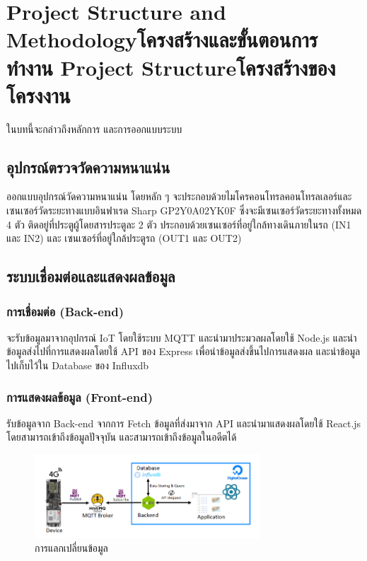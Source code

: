 \chapter{\ifproject%
\ifenglish Project Structure and Methodology\else โครงสร้างและขั้นตอนการทำงาน\fi
\else%
\ifenglish Project Structure\else โครงสร้างของโครงงาน\fi
\fi
}

ในบทนี้จะกล่าวถึงหลักการ และการออกแบบระบบ

\section{อุปกรณ์ตรวจวัดความหนาแน่น}
ออกแบบอุปกรณ์วัดความหนาแน่น โดยหลัก ๆ จะประกอบด้วยไมโครคอนโทรลคอนโทรลเลอร์และเซนเซอร์วัดระยะทางแบบอินฟาเรด Sharp GP2Y0A02YK0F ซึ่งจะมีเซนเซอร์วัดระยะทางทั้งหมด 4 ตัว ติดอยู่ที่ประตูผู้โดยสารประตูละ 2 ตัว ประกอบด้วยเซนเซอร์ที่อยู่ใกล้ทางเดินภายในรถ (IN1 และ IN2) และ เซนเซอร์ที่อยู่ใกล้ประตูรถ (OUT1 และ OUT2) 


\section{ระบบเชื่อมต่อและแสดงผลข้อมูล}

\subsection{การเชื่อมต่อ (Back-end)}
จะรับข้อมูลมาจากอุปกรณ์ IoT โดยใช้ระบบ MQTT และนำมาประมวลผลโดยใช้ Node.js และนำข้อมูลส่งไปที่การแสดงผลโดยใช้ API ของ Express เพื่อนำข้อมูลส่งขึ้นไปการแสดงผล และนำข้อมูลไปเก็บไว้ใน Database ของ Influxdb

\subsection{การแสดงผลข้อมูล (Front-end)}
รับข้อมูลจาก Back-end จากการ Fetch ข้อมูลที่ส่งมาจาก API และนำมาแสดงผลโดยใช้ React.js โดยสามารถเข้าถึงข้อมูลปัจจุบัน และสามารถเข้าถึงข้อมูลในอดีตได้

\begin{figure}[h!]
    \begin{center}
      \includegraphics[width=0.75\textwidth]{exchange-data.png}
    \end{center}
    \caption[Poem]{การแลกเปลี่ยนข้อมูล}
    \label{fig:exchangedata}
  \end{figure}

